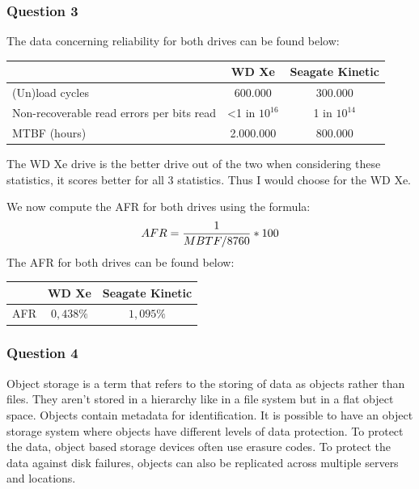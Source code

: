 \documentclass[12pt,a4paper,oneside]{article}
\begin{document}
\subsubsection*{Question 3}
The data concerning reliability for both drives can be found below:
\begin{table}[h]
\centering
\begin{tabular}{l|c|c}
                                          & WD Xe                    & Seagate Kinetic \\\hline
(Un)load cycles                           & 600.000                  & 300.000         \\
Non-recoverable read errors per bits read & \textless 1 in $10^{16}$ & 1 in $10^{14}$  \\
MTBF (hours)                              & 2.000.000                & 800.000         \\
\end{tabular}
\end{table}
The WD Xe drive is the better drive out of the two when considering these statistics, it scores better for all 3 statistics. Thus I would choose for the WD Xe.\par
We now compute the AFR for both drives using the formula:\\
\begin{equation*}
\centering
AFR = \frac{1}{MBTF/8760} * 100
\end{equation*}
The AFR for both drives can be found below:
\begin{table}[h]
\centering
\begin{tabular}{l|c|c}
    & WD Xe     & Seagate Kinetic \\\hline
AFR & $0,438\%$ & $1,095\%$       \\
\end{tabular}
\end{table}
\subsubsection*{Question 4}
Object storage is a term that refers to the storing of data as objects rather than files. They aren't stored in a hierarchy like in a file system but in a flat object space. Objects contain metadata for identification. It is possible to have an object storage system where objects have different levels of data protection. To protect the data, object based storage devices often use erasure codes. To protect the data against disk failures, objects can also be replicated across multiple servers and locations.
\end{document}
